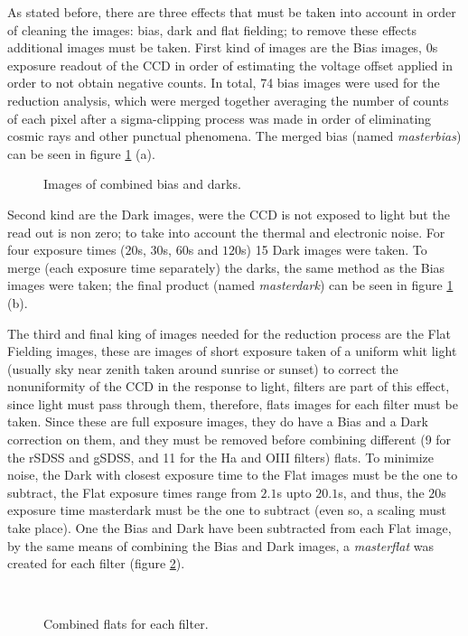 \documentclass{aa}
\begin{document}
    As stated before, there are three effects that must be taken into account in order of cleaning the images: bias, dark and flat fielding; to remove these effects additional images must be taken. First kind of images are the Bias images, $0$s exposure readout of the CCD in order of estimating the voltage offset applied in order to not obtain negative counts. In total, 74 bias images were used for the reduction analysis, which were merged together averaging the number of counts of each pixel after a sigma-clipping process was made in order of eliminating cosmic rays and other punctual phenomena. The merged bias (named \textit{masterbias}) can be seen in figure \ref{fig: Bias and Dark} (a).
    \begin{figure}[H]
      \centering
      \quad
      \caption{Images of combined bias and darks.}
      \label{fig: Bias and Dark}
    \end{figure}
    Second kind are the Dark images, were the CCD is not exposed to light but the read out is non zero; to take into account the thermal and electronic noise. For four exposure times ($20$s, $30$s, $60$s and $120$s) 15 Dark images were taken. To merge (each exposure time separately) the darks, the same method as the Bias images were taken; the final product (named \textit{masterdark}) can be seen in figure \ref{fig: Bias and Dark} (b).  

    The third and final king of images needed for the reduction process are the Flat Fielding images, these are images of short exposure taken of a uniform whit light (usually sky near zenith taken around sunrise or sunset) to correct the nonuniformity of the CCD in the response to light, filters are part of this effect, since light must pass through them, therefore, flats images for each filter must be taken. Since these are full exposure images, they do have a Bias and a Dark correction on them, and they must be removed before combining different (9 for the rSDSS and gSDSS, and 11 for the Ha and OIII filters) flats. To minimize noise, the Dark with closest exposure time to the Flat images must be the one to subtract, the Flat exposure times range from $2.1$s upto $20.1$s, and thus, the $20$s exposure time masterdark must be the one to subtract (even so, a scaling must take place). One the Bias and Dark have been subtracted from each Flat image, by the same means of combining the Bias and Dark images, a \textit{masterflat} was created for each filter (figure \ref{fig: Masterflats}).
    \begin{figure}[H]
      \centering
      \quad
      \\
      \quad
      \caption{Combined flats for each filter.}
      \label{fig: Masterflats}
    \end{figure}
\end{document}
